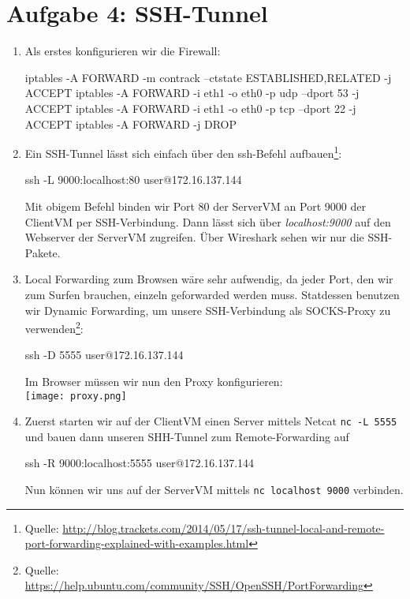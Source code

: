 \documentclass{scrartcl}
\begin{document}
	\section*{Aufgabe 4: SSH-Tunnel}
	\label{sec:SSH-Tunnel}
	\begin{enumerate}[\bfseries 1.]
		\item
		    Als erstes konfigurieren wir die Firewall:
            \begin{rootcommands}
iptables -A FORWARD -m contrack --ctstate ESTABLISHED,RELATED -j ACCEPT
iptables -A FORWARD -i eth1 -o eth0 -p udp --dport 53 -j ACCEPT
iptables -A FORWARD -i eth1 -o eth0 -p tcp --dport 22 -j ACCEPT
iptables -A FORWARD -j DROP
            \end{rootcommands}

	\item
		Ein SSH-Tunnel lässt sich einfach über den ssh-Befehl aufbauen\footnote{Quelle: \url{http://blog.trackets.com/2014/05/17/ssh-tunnel-local-and-remote-port-forwarding-explained-with-examples.html}}:
        \begin{usercommands}
ssh -L 9000:localhost:80 user@172.16.137.144
        \end{usercommands}
		Mit obigem Befehl binden wir Port 80 der ServerVM an Port 9000 der ClientVM
		per SSH-Verbindung. Dann lässt sich über \textit{localhost:9000} auf den
		Webserver der ServerVM zugreifen. Über Wireshark sehen wir nur die
		SSH-Pakete.\\

	\item
	    Local Forwarding zum Browsen wäre sehr aufwendig, da jeder Port, den
		wir zum Surfen brauchen, einzeln geforwarded werden muss.
		Statdessen benutzen wir Dynamic Forwarding, um unsere SSH-Verbindung als
		SOCKS-Proxy zu verwenden\footnote{Quelle: \url{https://help.ubuntu.com/community/SSH/OpenSSH/PortForwarding}}:
        \begin{usercommands}
ssh -D 5555 user@172.16.137.144
        \end{usercommands}
		Im Browser müssen wir nun den Proxy konfigurieren:\\
        \texttt{[image: proxy.png]}

    \item
		Zuerst starten wir auf der ClientVM einen Server mittels Netcat
		\texttt{nc -L 5555} und bauen dann unseren SHH-Tunnel zum Remote-Forwarding
		auf
        \begin{usercommands}
ssh -R 9000:localhost:5555 user@172.16.137.144
        \end{usercommands}
        Nun können wir uns auf der ServerVM mittels \texttt{nc localhost 9000} verbinden.
	\end{enumerate}
\end{document}

